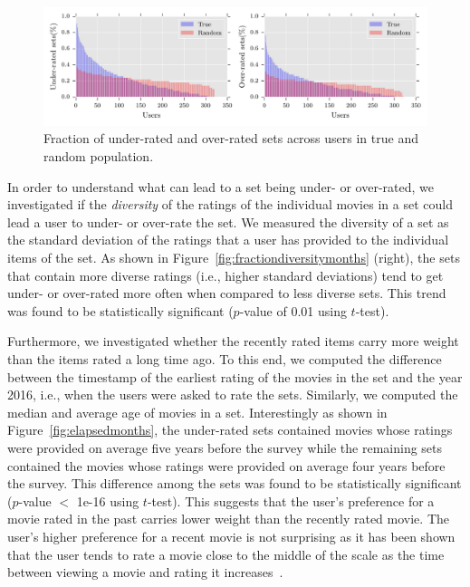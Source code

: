 \begin{figure}[tb]
  \centerline{\includegraphics[scale=0.82]{figures/underoverrated_exp.pdf}}
  \caption{Fraction of under-rated and over-rated sets across users in true and
  random population.}
  \label{fig:underrated}
\end{figure}

In order to understand what can lead to a set being under-
or over-rated, we investigated if the \emph{diversity} of the ratings of the
individual movies in a set could lead a user to under- or over-rate the set.
We measured the diversity of a set as the standard deviation of the ratings
that a user has provided to the individual items of the set.
As shown in Figure~\ref{fig:fractiondiversitymonths} (right), the sets 
that contain more diverse ratings (i.e., higher standard deviations) tend
to get under- or over-rated more often when compared to less diverse sets. This
trend was found to be
statistically significant ($p$-value of 0.01 using $t$-test).


Furthermore, we investigated whether the recently rated items
carry more weight than the items rated a long time ago. To this end, we computed
the difference between the timestamp of the earliest rating of the movies in the
set and the year 2016, i.e., when the users were asked to rate the sets.
Similarly, we computed the median and average age of movies in a set.
Interestingly as shown in Figure~\ref{fig:elapsedmonths}, the under-rated sets
contained movies whose ratings were provided on average five
years before the survey while the remaining sets contained the movies whose
ratings were provided on average four years before the survey. This difference
among the sets was found to be statistically significant ($p$-value $<$ 1e-16
using $t$-test). 
This suggests that the user's preference for a movie rated in the past carries
lower weight than the recently rated movie. 
The user's higher preference for a recent movie is not surprising as it has been
shown that the user tends to rate a movie close to the middle of the scale as
the time between viewing a movie and rating it increases~\cite{bollen2012remembering}.



